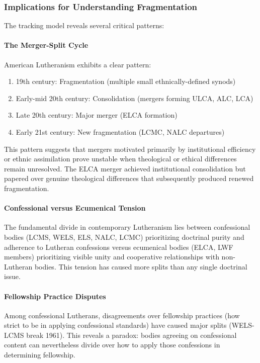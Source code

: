 \subsubsection{Implications for Understanding Fragmentation}

The tracking model reveals several critical patterns:

\paragraph{The Merger-Split Cycle} American Lutheranism exhibits a clear pattern:

\begin{enumerate}
\item 19th century: Fragmentation (multiple small ethnically-defined synods)
\item Early-mid 20th century: Consolidation (mergers forming ULCA, ALC, LCA)
\item Late 20th century: Major merger (ELCA formation)
\item Early 21st century: New fragmentation (LCMC, NALC departures)
\end{enumerate}

This pattern suggests that mergers motivated primarily by institutional efficiency or ethnic assimilation prove unstable when theological or ethical differences remain unresolved. The ELCA merger achieved institutional consolidation but papered over genuine theological differences that subsequently produced renewed fragmentation.

\paragraph{Confessional versus Ecumenical Tension} The fundamental divide in contemporary Lutheranism lies between confessional bodies (LCMS, WELS, ELS, NALC, LCMC) prioritizing doctrinal purity and adherence to Lutheran confessions versus ecumenical bodies (ELCA, LWF members) prioritizing visible unity and cooperative relationships with non-Lutheran bodies. This tension has caused more splits than any single doctrinal issue.

\paragraph{Fellowship Practice Disputes} Among confessional Lutherans, disagreements over fellowship practices (how strict to be in applying confessional standards) have caused major splits (WELS-LCMS break 1961). This reveals a paradox: bodies agreeing on confessional content can nevertheless divide over how to apply those confessions in determining fellowship.

